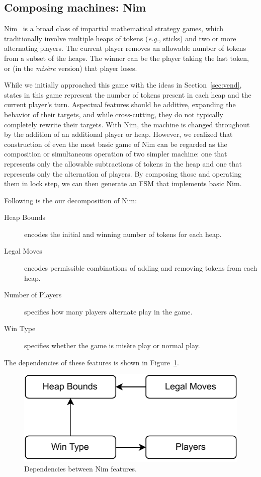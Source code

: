 \documentclass[sigplan,anonymous,review]{acmart}
\begin{document}
\subsection{Composing machines: Nim}

Nim~\cite{nim} is a broad class of impartial mathematical strategy games, which traditionally involve multiple heaps of tokens (\textit{e.g.}, sticks) and two or more alternating players. The current player removes an allowable number of tokens from a subset of the heaps. The winner can be the player taking the last token, or (in the \textit{mis\`{e}re} version) that player loses.

While we initially approached this game with the ideas in Section~\ref{sec:vend}, states in this game represent the number of tokens present in each heap and the current player's turn.  Aspectual features should be additive, expanding the behavior of their targets, and while cross-cutting, they do not typically completely rewrite their targets.  With Nim, the machine is changed throughout by the addition of an additional player or heap.   However, we realized that construction of even the most basic game of Nim can be regarded as the composition or simultaneous operation of two simpler machine:   one that represents only the allowable subtractions of tokens in the heap and one that represents only the alternation of players.   By composing those and operating them in lock step, we can then generate an FSM that implements basic Nim.

Following is the our decomposition of Nim:
\begin{description}
    \item[Heap Bounds] encodes the initial and winning number of tokens for each heap.
    \item[Legal Moves] encodes permissible combinations of adding and removing tokens from each heap.
    \item[Number of Players] specifies how many players alternate play in the game.
    \item[Win Type] specifies whether the game is mis\`{e}re play or normal play. 
\end{description}
The dependencies of these features is shown in Figure~\ref{fig:nimDependencies}.  

\begin{figure}
    \centering
    \includegraphics[width=0.5\linewidth]{figures/NimFeatures.pdf}
    \caption{Dependencies between Nim features.}
    \label{fig:nimDependencies}
\end{figure}
\end{document}
